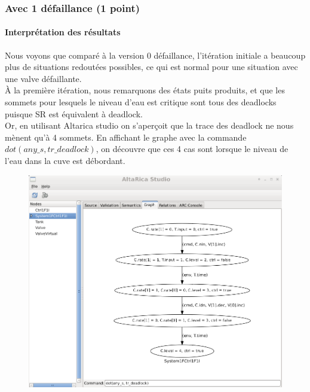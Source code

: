 \documentclass[a4paper]{book}
\begin{document}
\subsubsection{Avec 1 défaillance (1 point)}





\paragraph{Interprétation des résultats}

Nous voyons que comparé à la version 0 défaillance, l'itération initiale a beaucoup plus de situations redoutées possibles, ce qui est normal pour une situation avec une valve défaillante. \\
À la première itération, nous remarquons des états puits produits, et que les sommets pour lesquels le niveau d'eau est critique sont tous des deadlocks puisque SR est équivalent à deadlock. \\ 
Or, en utilisant Altarica studio on s'aperçoit que la trace des deadlock ne nous mènent qu'à 4 sommets. En affichant le graphe avec la commande $dot(any\_s, tr\_deadlock)$, on découvre que ces 4 cas sont lorsque le niveau de l'eau dans la cuve est débordant.

\begin{figure}[H]
  \centering
  \includegraphics[width=14cm]{img/CtrlF1I1.png}
\end{figure}
\end{document}
